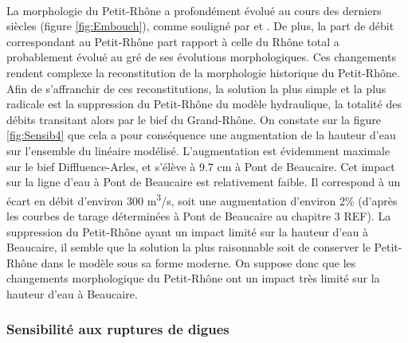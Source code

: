 \documentclass[11pt]{article}
\begin{document}
	\paragraph{} La morphologie du Petit-Rhône a profondément évolué au cours des derniers siècles (figure \ref{fig:Embouch}), comme souligné par \citet{pichard_les_2014} et \citet{raccasi_mutations_2008}. De plus, la part de débit correspondant au Petit-Rhône part rapport à celle du Rhône total a probablement évolué au gré de ses évolutions morphologiques. Ces changements rendent complexe la reconstitution de la morphologie historique du Petit-Rhône. Afin de s'affranchir de ces reconstitutions, la solution la plus simple et la plus radicale est la suppression du Petit-Rhône du modèle hydraulique, la totalité des débits transitant alors par le bief du Grand-Rhône. On constate sur la figure \ref{fig:Sensib4} que cela a pour conséquence une augmentation de la hauteur d'eau sur l'ensemble du linéaire modélisé. L'augmentation est évidemment maximale sur le bief Diffluence-Arles, et s'élève à 9.7 cm à Pont de Beaucaire. Cet impact sur la ligne d'eau à Pont de Beaucaire est relativement faible. Il correspond à un écart en débit d'environ 300 m\textsuperscript{3}/s, soit une augmentation d'environ 2\% (d'après les courbes de tarage déterminées à Pont de Beaucaire au chapitre 3 REF). La suppression du Petit-Rhône ayant un impact limité sur la hauteur d'eau à Beaucaire, il semble que la solution la plus raisonnable soit de conserver le Petit-Rhône dans le modèle sous sa forme moderne. On suppose donc que les changements morphologique du Petit-Rhône ont un impact très limité sur la hauteur d'eau à Beaucaire.
	
	\subsubsection{Sensibilité aux ruptures de digues}
	
\end{document}
